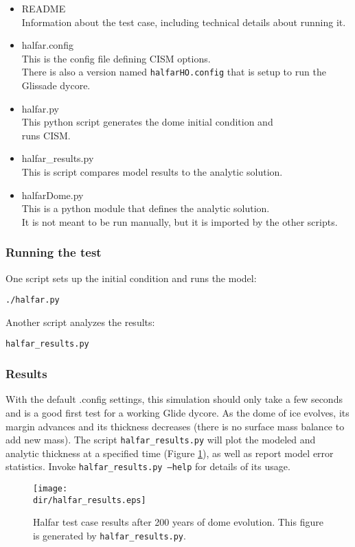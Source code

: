 \begin{itemize}
	\item README \\
		Information about the test case, including technical details about running it.
	\item halfar.config \\
		This is the config file defining CISM options. \\
    There is also a version named \texttt{halfarHO.config} that is setup to run the Glissade dycore.
	\item halfar.py \\
		This python script generates the dome initial condition and \\
		runs CISM.
	\item halfar\_results.py \\
		This is script compares model results to the analytic solution.
	\item halfarDome.py \\
		This is a python module that defines the analytic solution. \\
    It is not meant to be run manually, but it is imported by the other scripts.
\end{itemize}

\subsubsection{Running the test}
One script sets up the initial condition and runs the model:

\texttt{./halfar.py}

Another script analyzes the results:

\texttt{halfar\_results.py}

\subsubsection{Results}
\label{subsecc:halfar_results}
With the default .config settings, this simulation should only take a few seconds and is a good first test for a working Glide dycore.
As the dome of ice evolves, its margin advances and its thickness decreases (there is no surface mass balance to add new mass).  The script \texttt{halfar\_results.py} will plot the modeled and analytic thickness at a specified time (Figure \ref{fig:halfarresults}), as well as report model error statistics.  Invoke \texttt{halfar\_results.py --help} for details of its usage.


\begin{figure}[H]
	\centering
	\texttt{[image: \\dir/halfar\_results.eps]}
	\caption{Halfar test case results after 200 years of dome evolution. This figure is generated by \texttt{halfar\_results.py}.}
	\label{fig:halfarresults}
\end{figure}


